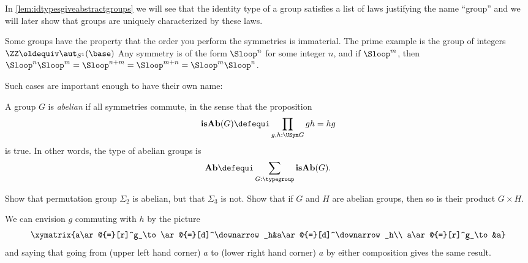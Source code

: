 \begin{remark}
In \cref{lem:idtypesgiveabstractgroups} we will see that the identity type of a group satisfies a list of laws justifying the name ``group''
and we will later show that groups are uniquely characterized by these laws.
\end{remark}
Some groups have the property that the order you perform the symmetries is immaterial.  The prime example is the group of integers $\ZZ\oldequiv \aut_{S^1}(\base)$  Any symmetry is of the form $\Sloop^n$ for some integer $n$, and if $\Sloop^m$, then $\Sloop^n\Sloop^m=\Sloop^{n+m}=\Sloop^{m+n}=\Sloop^m\Sloop^n$.

 Such cases are important enough to have their own name:
\begin{definition}\label{def:abgp}
  A group $G$ is \emph{abelian} if all symmetries commute, in the sense that
the proposition
$$\mathbf{isAb}(G)\defequi\prod_{g,h: \USym G}gh=hg$$
is true.  In other words, the type of abelian groups is
$$\mathbf{Ab}\defequi \sum_{G:\typegroup}\mathbf{isAb}(G).$$
\end{definition}
\begin{xca}\label{exer:first examples}
  Show that permutation group $\Sigma_2$ is abelian, but that $\Sigma_3$ is not.  Show that if $G$ and $H$ are abelian groups, then so is their product $G\times H$.
\end{xca}
We can envision $g$ commuting with $h$ by the picture
$$\xymatrix{a\ar@{=}[r]^g_\to\ar@{=}[d]^\downarrow_h&a\ar@{=}[d]^\downarrow_h\\
a\ar@{=}[r]^g_\to&a}$$
and saying that going from (upper left hand corner) $a$ to (lower right hand corner) $a$ by either composition gives the same result.

